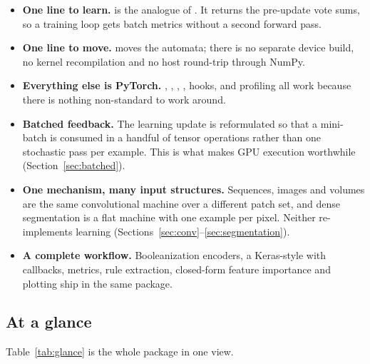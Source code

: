 \begin{itemize}[leftmargin=1.25em, itemsep=0.25em, topsep=0.35em]
  \item \textbf{One line to learn.}  is the analogue of
    . It returns the pre-update vote sums, so a
    training loop gets batch metrics without a second forward pass.
  \item \textbf{One line to move.}  moves the automata; there is no
    separate device build, no kernel recompilation and no host round-trip through NumPy.
  \item \textbf{Everything else is PyTorch.} , ,
    , , hooks,  and profiling all work
    because there is nothing non-standard to work around.
  \item \textbf{Batched feedback.} The learning update is reformulated so that a mini-batch
    is consumed in a handful of tensor operations rather than one stochastic pass per
    example. This is what makes GPU execution worthwhile (Section~\ref{sec:batched}).
  \item \textbf{One mechanism, many input structures.} Sequences, images and volumes are
    the same convolutional machine over a different patch set, and dense segmentation is a
    flat machine with one example per pixel. Neither re-implements learning
    (Sections~\ref{sec:conv}--\ref{sec:segmentation}).
  \item \textbf{A complete workflow.} Booleanization encoders, a Keras-style
     with callbacks, metrics, rule extraction, closed-form feature importance
    and plotting ship in the same package.
\end{itemize}

\subsection*{At a glance}

Table~\ref{tab:glance} is the whole package in one view.


